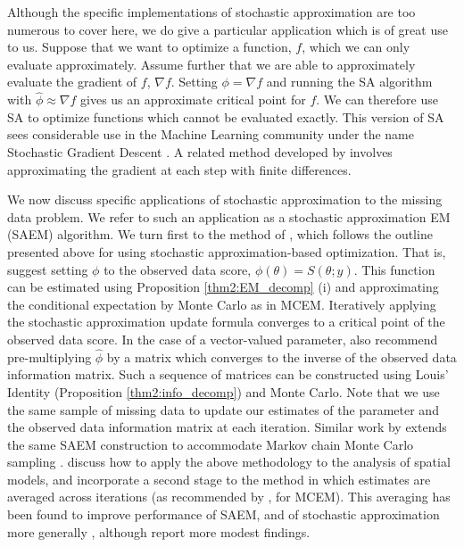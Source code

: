 \documentclass[11pt, oneside]{article}   	%
\begin{document}
Although the specific implementations of stochastic approximation are too numerous to cover here, we do give a particular application which is of great use to us. Suppose that we want to optimize a function, $f$, which we can only evaluate approximately. Assume further that we are able to approximately evaluate the gradient of $f$, $\nabla f$. Setting $\phi = \nabla f$ and running the SA algorithm with $\hat{\phi} \approx \nabla f$ gives us an approximate critical point for $f$. We can therefore use SA to optimize functions which cannot be evaluated exactly. This version of SA sees considerable use in the Machine Learning community under the name Stochastic Gradient Descent \citep{Bot10}. A related method developed by \citet{Kie52} involves approximating the gradient at each step with finite differences.

We now discuss specific applications of stochastic approximation to the missing data problem. We refer to such an application as a stochastic approximation EM (SAEM) algorithm. We turn first to the method of \citet{Gu98I}, which follows the outline presented above for using stochastic approximation-based optimization. That is, \citeauthor{Gu98I} suggest setting $\phi$ to the observed data score, $\phi(\theta) = S(\theta; y)$. This function can be estimated using Proposition \ref{thm2:EM_decomp} (i) and approximating the conditional expectation by Monte Carlo as in MCEM. Iteratively applying the stochastic approximation update formula converges to a critical point of the observed data score. In the case of a vector-valued parameter, \citeauthor{Gu98I} also recommend pre-multiplying $\hat{\phi}$ by a matrix which converges to the inverse of the observed data information matrix. Such a sequence of matrices can be constructed using Louis' Identity (Proposition \ref{thm2:info_decomp}) and Monte Carlo. Note that we use the same sample of missing data to update our estimates of the parameter and the observed data information matrix at each iteration. Similar work by \citet{Gu98II} extends the same SAEM construction to accommodate Markov chain Monte Carlo sampling \citep[see also][]{Cai10}. \citet{Gu01} discuss how to apply the above methodology to the analysis of spatial models, and incorporate a second stage to the method in which estimates are averaged across iterations (as recommended by \citealp{For03}, for MCEM). This averaging has been found to improve performance of SAEM, and of stochastic approximation more generally \citep{Pol92, Del99}, although \citet{Kuh05} report more modest findings.
\end{document}
